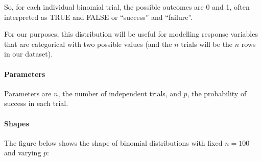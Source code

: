 \documentclass[]{book}
\newenvironment{Shaded}{\begin{snugshade}}{\end{snugshade}}
\newcommand{\DataTypeTok}[1]{\textcolor[rgb]{0.13,0.29,0.53}{#1}}
\newcommand{\DecValTok}[1]{\textcolor[rgb]{0.00,0.00,0.81}{#1}}
\newcommand{\FloatTok}[1]{\textcolor[rgb]{0.00,0.00,0.81}{#1}}
\newcommand{\KeywordTok}[1]{\textcolor[rgb]{0.13,0.29,0.53}{\textbf{#1}}}
\newcommand{\NormalTok}[1]{#1}
\newcommand{\OperatorTok}[1]{\textcolor[rgb]{0.81,0.36,0.00}{\textbf{#1}}}
\newcommand{\StringTok}[1]{\textcolor[rgb]{0.31,0.60,0.02}{#1}}
\let\oldparagraph\paragraph
\renewcommand{\paragraph}[1]{\oldparagraph{#1}\mbox{}}
\begin{document}
So, for each individual binomial trial, the possible outcomes are 0 and 1, often interpreted as TRUE and FALSE or ``success'' and ``failure''.

For our purposes, this distribution will be useful for modelling response variables that are categorical with two possible values (and the \(n\) trials will be the \(n\) rows in our dataset).

\hypertarget{parameters-3}{%
\paragraph{Parameters}\label{parameters-3}}

Parameters are \(n\), the number of independent trials, and \(p\), the probability of success in each trial.

\hypertarget{shapes-3}{%
\paragraph{Shapes}\label{shapes-3}}

The figure below shows the shape of binomial distributions with fixed \(n=100\) and varying \(p\):

\begin{Shaded}
\end{Shaded}
\end{document}
